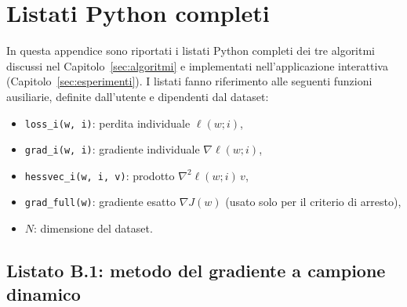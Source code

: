 \documentclass[a4paper,12pt]{article}
\numberwithin{equation}{section}
\numberwithin{figure}{section}
\numberwithin{table}{section}
\begin{document}
\section{Listati Python completi}\label{app:listati}

In questa appendice sono riportati i listati Python completi dei tre algoritmi
discussi nel Capitolo~\ref{sec:algoritmi} e implementati nell'applicazione
interattiva (Capitolo~\ref{sec:esperimenti}). I listati fanno riferimento alle
seguenti funzioni ausiliarie, definite dall'utente e dipendenti dal dataset:

\begin{itemize}
  \item \texttt{loss\_i(w, i)}: perdita individuale $\ell(w;i)$,
  \item \texttt{grad\_i(w, i)}: gradiente individuale $\nabla\ell(w;i)$,
  \item \texttt{hessvec\_i(w, i, v)}: prodotto $\nabla^2\ell(w;i)\,v$,
  \item \texttt{grad\_full(w)}: gradiente esatto $\nabla J(w)$ (usato solo per
  il criterio di arresto),
  \item $N$: dimensione del dataset.
\end{itemize}

\subsection{Listato B.1: metodo del gradiente a campione dinamico}
\end{document}
